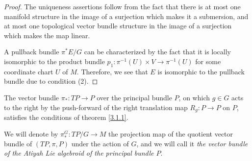 \begin{proof}
The uniqueness assertions follow from the fact that there is at most one manifold structure in the image of a surjection which makes it a submersion, and at most one topological vector bundle structure in the image of a surjection which makes the map linear.

A pullback bundle $\pi^*E/G$ can be characterized  by the fact that it is locally isomorphic to the product bundle $p_1: \pi^{-1}(U) \times V \to \pi^{-1}(U)$ for some coordinate chart $U$ of $M$. Therefore, we see that $E$ is isomorphic to the pullback bundle due to condition (2).
\end{proof}

\begin{theorem}\label{theoTPGexists}
The vector bundle $\pi_*:TP \to P$ over the principal bundle $P$, on which $g \in G$ acts to the right by the push-forward of the right translation map $R_g: P \to P$ on $P$, satisfies the conditions of theorem \ref{3.1.1}.
\end{theorem}

We will denote by $\pi_*^G:TP/G \to M$ the projection map of the quotient vector bundle of $(TP, \pi, P)$ under the action of $G$, and we will call it \emph{the vector bundle of the Atiyah Lie algebroid of the principal bundle $P$}.

